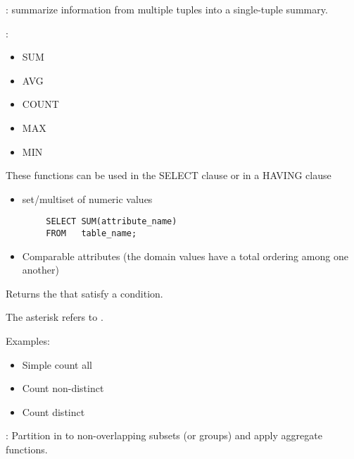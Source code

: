   \par {}: summarize information from multiple tuples into a single-tuple summary.

  \par {}:
    \begin{itemize}
      \item SUM
      \item AVG
      \item COUNT
      \item MAX
      \item MIN
    \end{itemize}

\par These functions can be used in the SELECT clause or in a HAVING clause


      \begin{itemize}
        \item set/multiset of numeric values
      \end{itemize}

      \begin{lstlisting}
        SELECT SUM(attribute_name)
        FROM   table_name;
      \end{lstlisting}

      \begin{itemize}
        \item Comparable attributes (the domain values have a total ordering among one another)
      \end{itemize}

      \par Returns the  that satisfy a condition.
      \par The asterisk refers to .
      \par Examples:
        \begin{itemize}
          \item Simple count all
          \item Count non-distinct
          \item Count distinct
        \end{itemize}

  \par {}: Partition in to non-overlapping subsets (or groups) and apply aggregate functions.

